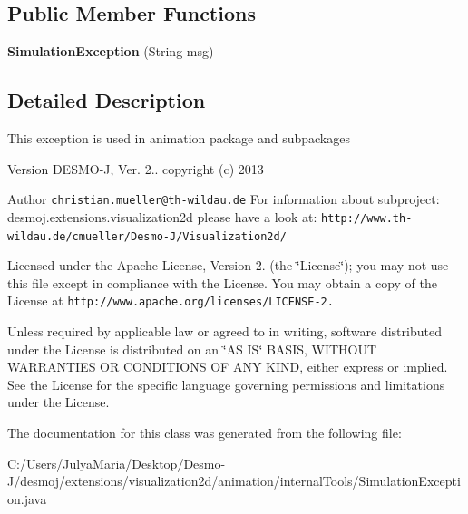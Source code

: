 \subsection*{Public Member Functions}
\begin{DoxyCompactItemize}
\item 
{\bfseries Simulation\-Exception} (String msg)\label{classdesmoj_1_1extensions_1_1visualization2d_1_1animation_1_1internal_tools_1_1_simulation_exception_a45db37a17291719d9f10ad4e5da10898}

\end{DoxyCompactItemize}


\subsection{Detailed Description}
This exception is used in animation package and subpackages

\begin{DoxyVersion}{Version}
D\-E\-S\-M\-O-\/\-J, Ver. 2.. copyright (c) 2013 
\end{DoxyVersion}
\begin{DoxyAuthor}{Author}
{\tt christian.\-mueller@th-\/wildau.\-de} For information about subproject\-: desmoj.\-extensions.\-visualization2d please have a look at\-: {\tt http\-://www.\-th-\/wildau.\-de/cmueller/\-Desmo-\/\-J/\-Visualization2d/}
\end{DoxyAuthor}
Licensed under the Apache License, Version 2. (the \char`\"{}\-License\char`\"{}); you may not use this file except in compliance with the License. You may obtain a copy of the License at {\tt http\-://www.\-apache.\-org/licenses/\-L\-I\-C\-E\-N\-S\-E-\/2.}

Unless required by applicable law or agreed to in writing, software distributed under the License is distributed on an \char`\"{}\-A\-S I\-S\char`\"{} B\-A\-S\-I\-S, W\-I\-T\-H\-O\-U\-T W\-A\-R\-R\-A\-N\-T\-I\-E\-S O\-R C\-O\-N\-D\-I\-T\-I\-O\-N\-S O\-F A\-N\-Y K\-I\-N\-D, either express or implied. See the License for the specific language governing permissions and limitations under the License. 

The documentation for this class was generated from the following file\-:\begin{DoxyCompactItemize}
\item 
C\-:/\-Users/\-Julya\-Maria/\-Desktop/\-Desmo-\/\-J/desmoj/extensions/visualization2d/animation/internal\-Tools/Simulation\-Exception.\-java\end{DoxyCompactItemize}

